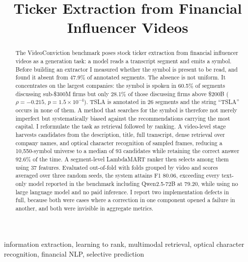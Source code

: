 \documentclass[conference]{IEEEtran}
\begin{document}
\title{Ticker Extraction from Financial Influencer Videos}

\author{
}

\maketitle

\begin{abstract}
The VideoConviction benchmark poses stock ticker extraction from financial
influencer videos as a generation task: a model reads a transcript segment and
emits a symbol. Before building an extractor I measured whether the symbol is
present to be read, and found it absent from 47.9\% of annotated segments. The
absence is not uniform. It concentrates on the largest companies: the symbol is
spoken in 60.5\% of segments discussing sub-\$300M firms but only 28.1\% of
those discussing firms above \$200B ($\rho=-0.215$, $p=1.5\times10^{-4}$). TSLA
is annotated in 26 segments and the string ``TSLA'' occurs in none of them. A
method that searches for the symbol is therefore not merely imperfect but
systematically biased against the recommendations carrying the most capital. I
reformulate the task as retrieval followed by ranking. A video-level stage
harvests candidates from the description, title, full transcript, dense
retrieval over company names, and optical character recognition of sampled
frames, reducing a 10{,}550-symbol universe to a median of 93 candidates while
retaining the correct answer 92.6\% of the time. A segment-level LambdaMART
ranker then selects among them using 37 features. Evaluated out-of-fold with
folds grouped by video and scores averaged over three random seeds, the system
attains F1 80.06, exceeding every text-only model reported in the benchmark
including Qwen2.5-72B at 79.20, while using no large language model and no paid
inference. I report two implementation defects in full, because both were cases
where a correction in one component opened a failure in another, and both were
invisible in aggregate metrics.
\end{abstract}

\begin{IEEEkeywords}
information extraction, learning to rank, multimodal retrieval, optical
character recognition, financial NLP, selective prediction
\end{IEEEkeywords}
\end{document}
